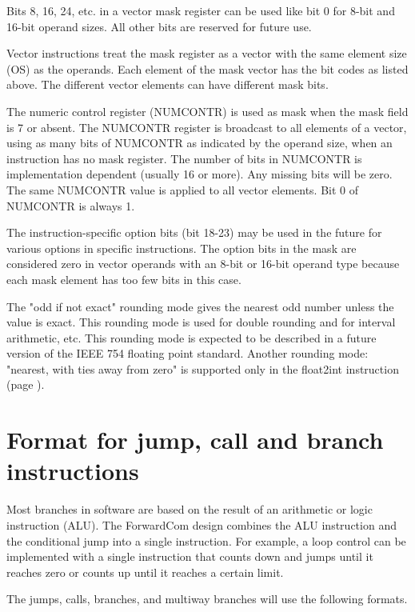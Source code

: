 \documentclass[forwardcom.tex]{subfiles}
\begin{document}
Bits 8, 16, 24, etc. in a vector mask register can be used like bit 0 for 8-bit and 16-bit operand sizes. All other bits are reserved for future use.
\vv

Vector instructions treat the mask register as a vector with the same element size (OS) as the operands. Each element of the mask vector has the bit codes as listed above. The different vector elements can have different mask bits.
\vv

The numeric control register (NUMCONTR) is used as mask when the mask field is 7 or absent. The NUMCONTR register is broadcast to all elements of a vector, using as many bits of NUMCONTR as indicated by the operand size, when an instruction has no mask register. The number of bits in NUMCONTR is implementation dependent (usually 16 or more). Any missing bits will be zero. 
The same NUMCONTR value is applied to all vector elements. 
Bit 0 of NUMCONTR is always 1.
\vv

The instruction-specific option bits (bit 18-23) may be used in the future for various options in specific instructions. The option bits in the mask are considered zero in vector operands with an 8-bit or 16-bit operand type because each mask element has too few bits in this case. 
\vv

The "odd if not exact" rounding mode gives the nearest odd number unless the value is exact. This rounding mode is used for double rounding and for interval arithmetic, etc. This rounding mode is expected to be described in a future version of the IEEE 754 floating point standard. Another rounding mode: "nearest, with ties away from zero" is supported only in the float2int instruction (page \pageref{table:float2intInstruction}).
\vv

\section{Format for jump, call and branch instructions}
Most branches in software are based on the result of an arithmetic or logic instruction (ALU). The ForwardCom design combines the ALU instruction and the conditional jump into a single instruction. For example, a loop control can be implemented with a single instruction that counts down and jumps until it reaches zero or counts up until it reaches a certain limit.
\vv

The jumps, calls, branches, and multiway branches will use the following formats.
\end{document}
